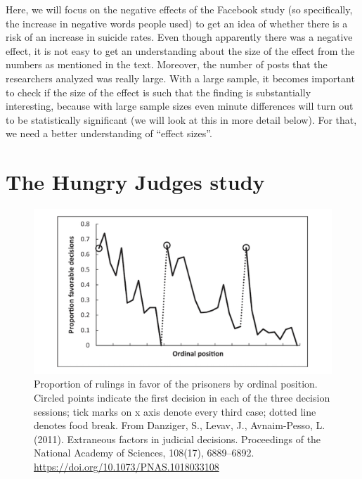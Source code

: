 \documentclass[
  oneside]{krantz}
\begin{document}
Here, we will focus on the negative effects of the Facebook study (so specifically, the increase in negative words people used) to get an idea of whether there is a risk of an increase in suicide rates. Even though apparently there was a negative effect, it is not easy to get an understanding about the size of the effect from the numbers as mentioned in the text. Moreover, the number of posts that the researchers analyzed was really large. With a large sample, it becomes important to check if the size of the effect is such that the finding is substantially interesting, because with large sample sizes even
minute differences will turn out to be statistically significant (we will look at this in more detail below). For that, we need a better understanding of ``effect sizes''.

\hypertarget{the-hungry-judges-study}{%
\section{The Hungry Judges study}\label{the-hungry-judges-study}}



\begin{figure}

{\centering \includegraphics[width=1\linewidth]{images/hungryjudges} 

}

\caption{Proportion of rulings in favor of the prisoners by ordinal position. Circled points indicate the first decision in each of the three decision sessions; tick marks on x axis denote every third case; dotted line denotes food break. From Danziger, S., Levav, J., Avnaim-Pesso, L. (2011). Extraneous factors in judicial decisions. Proceedings of the National Academy of Sciences, 108(17), 6889--6892. \url{https://doi.org/10.1073/PNAS.1018033108}}\label{fig:hungryjudges}
\end{figure}
\end{document}
